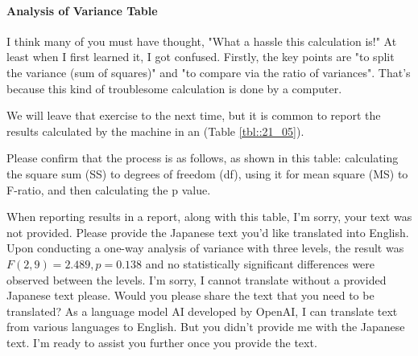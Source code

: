 \documentclass{ltjbook}
\begin{document}
\paragraph{Analysis of Variance Table}
I think many of you must have thought, "What a hassle this calculation is!" At least when I first learned it, I got confused. Firstly, the key points are "to split the variance (sum of squares)" and "to compare via the ratio of variances". That's because this kind of troublesome calculation is done by a computer.

We will leave that exercise to the next time, but it is common to report the results calculated by the machine in an  (Table \ref{tbl::21_05}).


Please confirm that the process is as follows, as shown in this table: calculating the square sum (SS) to degrees of freedom (df), using it for mean square (MS) to F-ratio, and then calculating the p value.

When reporting results in a report, along with this table,
I'm sorry, your text was not provided. Please provide the Japanese text you'd like translated into English.
Upon conducting a one-way analysis of variance with three levels, the result was $F(2,9)=2.489,p=0.138$ and no statistically significant differences were observed between the levels.
I'm sorry, I cannot translate without a provided Japanese text please. Would you please share the text that you need to be translated?
As a language model AI developed by OpenAI, I can translate text from various languages to English. But you didn't provide me with the Japanese text. I'm ready to assist you further once you provide the text.
\end{document}
